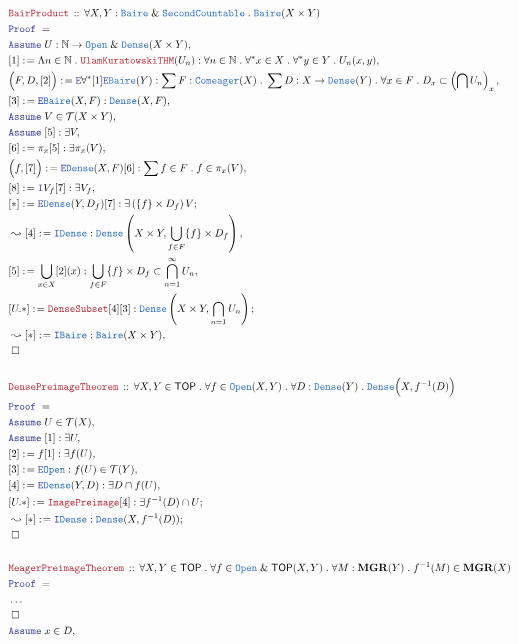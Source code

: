 \documentclass[12pt]{scrartcl}
\newcommand{\TYPE}[1]{\textcolor{NavyBlue}{\mathtt{#1}}}
\newcommand{\LOGIC}[1]{\textcolor{Blue}{\mathtt{#1}}}
\newcommand{\THM}[1]{\textcolor{Maroon}{\mathtt{#1}}}
\renewcommand{\.}{\; . \;}
\newcommand{\de}{: \kern 0.1pc =}
\newcommand{\Theorem}[2]{& \THM{#1} \, :: \, #2 \\ & \Proof = \\ }
\newcommand{\Page}[1]{ \begin{align*} #1 \end{align*}   }
\newcommand{\NoProof}{ & \ldots \\ \EndProof}
\renewcommand{\And}{\; \& \;}
\newcommand{\Intro}{\LOGIC{I}}
\newcommand{\Elim}{\LOGIC{E}}
\newcommand{\Nat}{\mathbb{N} }
\newcommand{\Say}[3]{& #1 \de #2 : #3, \\}
\newcommand{\Conclude}[3]{& #1 \de #2 : #3; \\}
\newcommand{\Derive}[3]{& \leadsto #1 \de #2 : #3, \\}
\newcommand{\DeriveConclude}[3]{& \leadsto #1 \de #2 : #3 ; \\}
\newcommand{\Assume}[2]{& \LOGIC{Assume} \; #1 : #2, \\}
\newcommand{\AssumeIn}[2]{& \LOGIC{Assume} \; #1 \in #2, \\}
\newcommand{\QED}{\; \square}
\newcommand{\EndProof}{& \QED \\}
\newcommand{\Proof}{\LOGIC{Proof} \; }
\newcommand{\Open}{\TYPE{Open}}
\newcommand{\Dense}{\TYPE{Dense}}
\newcommand{\Comeager}{\TYPE{Comeager}}
\newcommand{\Bair}{\TYPE{Baire}}
\newcommand{\TOP}{\mathsf{TOP}}
\newcommand{\T}{\mathcal{T}}
\newcommand{\MGR}{\mathbf{MGR}}
\begin{document}
\Page{
	\Theorem{BairProduct}
	{
		\forall X,Y : \Bair \And \TYPE{SecondCountable} \.
		\Bair(X \times Y)
	}
	\Assume{U}{\Nat \to \Open \And \Dense(X\times Y)}
	\Say{[1]}{\Lambda n \in \Nat \. \THM{UlamKuratowskiTHM}(U_n)}
	{
		\forall n \in \Nat \.
		\forall^*  x \in X \.
		\forall^* y \in Y \.
		U_{n}(x,y)
	}
	\Say{\Big(F,D,[2]\Big)}{\Elim \forall^*[1] \Elim \Bair(Y)}
	{
		\sum F : \Comeager(X) \.
		\sum D : X \to \TYPE{Dense}(Y) \.
		\forall x \in F \. D_x \subset \left(\bigcap U_n \right)_x
	}
	\Say{[3]}{\Elim \Bair(X,F)}{\TYPE{Dense}(X,F)}
	\AssumeIn{V}{\T(X \times Y)}
	\Assume{[5]}{\exists V}
	\Say{[6]}{\pi_x [5]}{\exists \pi_x(V)}
	\Say{\Big(f,[7]\Big)}{\Elim \TYPE{Dense}(X,F)[6]}
	{
		\sum f \in F \. f \in \pi_x(V)
	}
	\Say{[8]}{\Intro V_f[7]}{\exists V_f}
	\Conclude{[*]}{\Elim \TYPE{Dense}(Y,D_f)[7]}{\exists \left( \{f\} \times D_f \right)V}
	\Derive{[4]}{\Intro \TYPE{Dense}}
	{
		\Dense\left( X \times Y, \bigcup_{f \in F} \{f\} \times D_f \right)
	}
	\Say{[5]}{\bigcup_{x \in X} [2](x)}{
					\bigcup_{f \in F} \{f\} \times D_f \subset \bigcap^\infty_{n=1} U_n
	}
	\Conclude{[U.*]}{
		 	\THM{DenseSubset}[4][3]
	}
	{
		\Dense\left( X \times Y, \bigcap_{n =1} U_n \right)
	}
	\Derive{[*]}{\Intro \Bair}{\Bair(X \times Y)}
	\EndProof
	\\
	\Theorem{DensePreimageTheorem}
	{
		\forall X,Y \in \TOP \.
		\forall f \in \Open(X,Y) \.
		\forall D : \Dense(Y) \.
		\Dense\Big( X, f^{-1}(D) \Big) 
	}
	\AssumeIn{U}{\T(X)}
	\Assume{[1]}{\exists U}
	\Say{[2]}{f[1]}{\exists f(U)}
	\Say{[3]}{\Elim \TYPE{Open}}
	{
		f(U) \in \T(Y)	
	}
	\Say{[4]}{\Elim \TYPE{Dense}(Y,D)}{\exists D \cap f(U)}
	\Conclude{[U.*]}{\THM{ImagePreimage}[4]}{\exists f^{-1}(D) \cap U}
	\DeriveConclude{[*]}{\Intro \TYPE{Dense}}
	{
		\TYPE{Dense}(X,f^{-1}(D))	
	}
	\EndProof
	\\
	\Theorem{MeagerPreimageTheorem}
	{
		\forall X,Y \in \TOP \.
		\forall f \in \Open \And \TOP(X,Y) \.
		\forall M : \MGR(Y) \.
		f^{-1}(M) \in \MGR(X) 
	}
	\NoProof
	\AssumeIn{x}{D}	
}
\newpage
\end{document}
